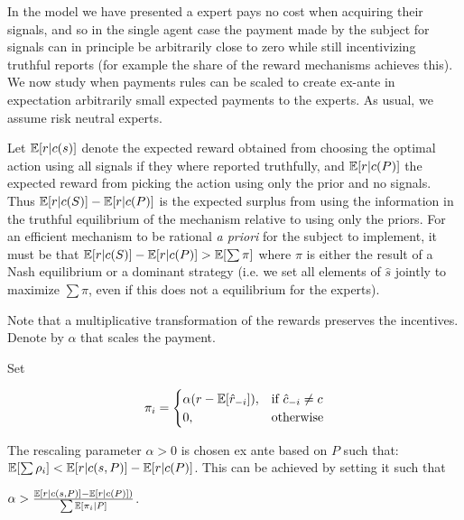 In the model we have presented a expert pays no cost when acquiring their signals, and so in the single agent case the payment made by the subject for signals can in principle be arbitrarily close to zero while still incentivizing truthful reports (for example the share of the reward mechanisms achieves this). We now study when payments rules can be scaled to create ex-ante in expectation arbitrarily small expected payments to the experts. As usual, we assume risk neutral experts. 


Let $\operatorname*{\mathbb E}[r|c(s)]$ denote the expected reward obtained from choosing the optimal action using all signals if they where reported truthfully, and $\operatorname*{\mathbb E}[r|c(P)] $ the expected reward from picking the action using only the prior and no signals. Thus $\operatorname*{\mathbb E}[r|c(S)] - \operatorname*{\mathbb E}[r|c(P)] $ is the expected surplus from using the information in the truthful equilibrium of the mechanism relative to using only the priors. For an efficient mechanism to be rational \emph{a priori} for the subject to implement, it must be that $\operatorname*{\mathbb E}[r|c(S)] - \operatorname*{\mathbb E}[r|c(P)] > \operatorname*{\mathbb E}[\sum \pi]$ where $\pi$ is either the result of a Nash equilibrium or a dominant strategy (i.e. we set all elements of $\hat{s}$ jointly to maximize $\sum \pi$, even if this does not a equilibrium for the experts).

Note that a multiplicative transformation of the rewards preserves the incentives. Denote by $\alpha$ that scales the payment.

\begin{mech}
Set

\[
    \pi_i = 
\begin{cases}
    \alpha (r - \expec[\hat{r}_{-i}] ),& \text{if } \hat{c}_{-i} \neq c\\
    0,              & \text{otherwise}
\end{cases}
\]

The rescaling parameter $\alpha>0$ is chosen ex ante based on $P$ such that: $ \operatorname*{\mathbb E}[\sum \rho_i] < \operatorname*{\mathbb E}[r|c(s,P)] - \operatorname*{\mathbb E}[r|c(P)] $. This can be achieved by setting it such that

 $\alpha >   \frac{\operatorname*{\mathbb E}[r|c(s,P)] - \operatorname*{\mathbb E}[r|c(P)] )}{\sum \operatorname*{\mathbb E}[\pi_i|P] }  $. 

\end{mech}




